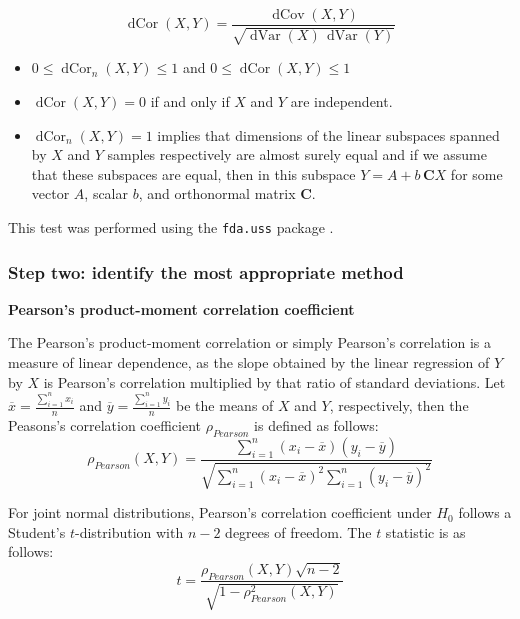 \documentclass[a4paper]{article}
\begin{document}
\begin{equation}
\operatorname
{dCor}(X,Y) = \frac{\operatorname{dCov}(X,Y)}{\sqrt{\operatorname{dVar}(X)\,\operatorname{dVar}(Y)}}
\end{equation}

\begin{itemize}
\item $0\leq\operatorname{dCor}_n(X,Y)\leq1$ and $0\leq\operatorname{dCor}(X,Y)\leq1$
\item $\operatorname{dCor}(X,Y) = 0$ if and only if $X$ and $Y$ are independent.
\item $\operatorname{dCor}_n(X,Y) = 1$ implies that dimensions of the linear subspaces spanned by $X$ and $Y$ samples respectively are almost surely equal and if we assume that these subspaces are equal, then in this subspace $Y = A + b\,\mathbf{C}X$ for some vector $A$, scalar $b$, and orthonormal matrix $\mathbf{C}$.
\end{itemize}

This test was performed using the \texttt{fda.uss} package \citep{fda.usc.package}. 

\subsubsection*{Step two: identify the most appropriate method} 
\textbf{Pearson's product-moment correlation coefficient}

The Pearson's product-moment correlation or simply Pearson's correlation is a measure of linear dependence, as the slope obtained by the linear regression of $Y$ by $X$ is Pearson's correlation multiplied by that ratio of standard deviations.
Let $\overline{x} = \frac{\sum_{i=1}^{n} x_{i}}{n}$ and $\overline{y} = \frac{\sum_{i=1}^{n} y_{i}}{n}$ be the means of $X$ and $Y$, respectively, then the Peasons's correlation coefficient $\rho_{Pearson}$ is defined as follows: 
\begin{equation}
\rho_{Pearson}(X, Y) = \frac{\sum_{i=1}^{n}(x_{i} - \overline{x})(y_{i} - \overline{y})}
{\sqrt{\sum_{i=1}^{n}(x_{i} - \overline{x})^2  \sum_{i=1}^{n}(y_{i} - \overline{y})^2}}
\end{equation}


For joint normal distributions, Pearson's correlation coefficient under $H_{0}$ follows a Student's $t$-distribution with $n-2$ degrees of freedom. The $t$ statistic is as follows:
\begin{equation}
t = \frac{\rho_{Pearson}(X, Y) \sqrt{n -2}}{\sqrt{1- \rho^{2}_{Pearson}(X, Y)}}
\end{equation}
\end{document}

